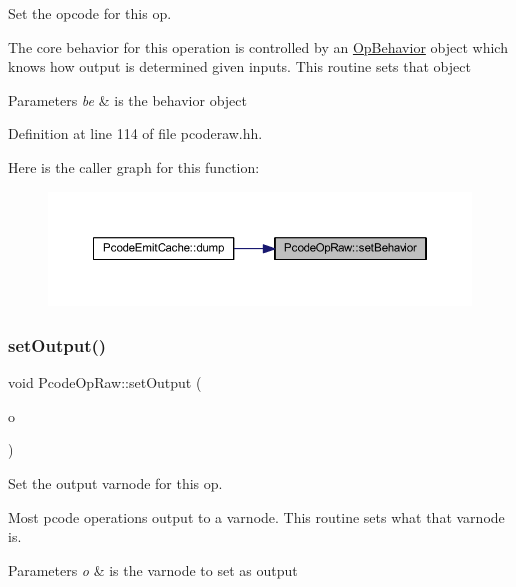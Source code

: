 Set the opcode for this op. 

The core behavior for this operation is controlled by an \mbox{\hyperlink{class_op_behavior}{Op\+Behavior}} object which knows how output is determined given inputs. This routine sets that object 
\begin{DoxyParams}{Parameters}
{\em be} & is the behavior object \\
\hline
\end{DoxyParams}


Definition at line 114 of file pcoderaw.\+hh.

Here is the caller graph for this function\+:
\nopagebreak
\begin{figure}[H]
\begin{center}
\leavevmode
\includegraphics[width=350pt]{class_pcode_op_raw_a294ebc1a204972cfdc831faf6aff3f48_icgraph}
\end{center}
\end{figure}
\mbox{\label{class_pcode_op_raw_a1c25e2a933548b236169924aa3b40d46}} 
\subsubsection{\texorpdfstring{setOutput()}{setOutput()}}
{\footnotesize\ttfamily void Pcode\+Op\+Raw\+::set\+Output (\begin{DoxyParamCaption}\item[{\mbox{\hyperlink{struct_varnode_data}{Varnode\+Data}} $\ast$}]{o }\end{DoxyParamCaption})\hspace{0.3cm}{\ttfamily [inline]}}



Set the output varnode for this op. 

Most pcode operations output to a varnode. This routine sets what that varnode is. 
\begin{DoxyParams}{Parameters}
{\em o} & is the varnode to set as output \\
\hline
\end{DoxyParams}


